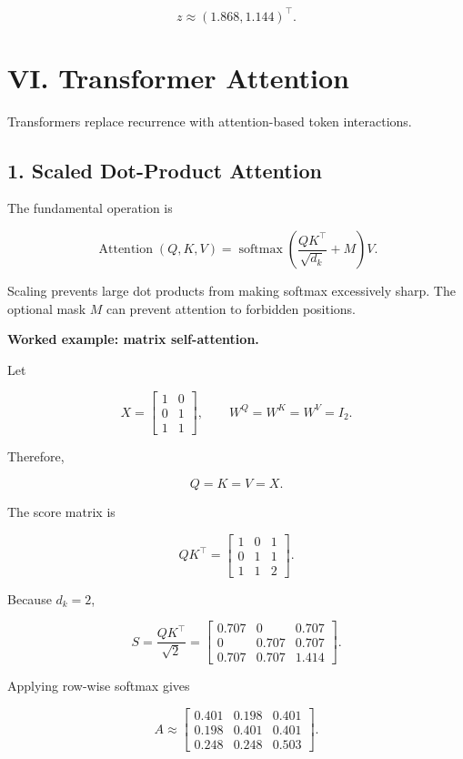 \documentclass[11pt,a4paper,twoside]{article}
\newcommand{\softmax}{\operatorname{softmax}}
\begin{document}
\[
\boxed{z\approx(1.868,1.144)^\top.}
\]

\section*{VI. Transformer Attention}

Transformers replace recurrence with attention-based token interactions.

\subsection*{1. Scaled Dot-Product Attention}

The fundamental operation is

\[
\boxed{
\operatorname{Attention}(Q,K,V)
=\softmax\left(\frac{QK^\top}{\sqrt{d_k}}+M\right)V
}.
\]

Scaling prevents large dot products from making softmax excessively sharp. The optional mask $M$ can prevent attention to forbidden positions.

\textbf{Worked example: matrix self-attention.}

Let

\[
X=
\begin{bmatrix}
1&0\\
0&1\\
1&1
\end{bmatrix},
\qquad
W^Q=W^K=W^V=I_2.
\]

Therefore,

\[
Q=K=V=X.
\]

The score matrix is

\[
QK^\top=
\begin{bmatrix}
1&0&1\\
0&1&1\\
1&1&2
\end{bmatrix}.
\]

Because $d_k=2$,

\[
S=\frac{QK^\top}{\sqrt2}
=
\begin{bmatrix}
0.707&0&0.707\\
0&0.707&0.707\\
0.707&0.707&1.414
\end{bmatrix}.
\]

Applying row-wise softmax gives

\[
A\approx
\begin{bmatrix}
0.401&0.198&0.401\\
0.198&0.401&0.401\\
0.248&0.248&0.503
\end{bmatrix}.
\]
\end{document}
